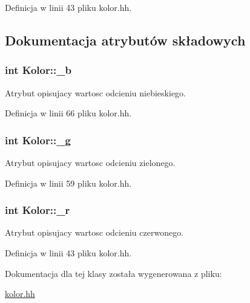 Definicja w linii 43 pliku kolor.\+hh.



\subsection{Dokumentacja atrybutów składowych}
\hypertarget{class_kolor_a543b5984743ac9d471409c697382038b}{}
\subsubsection[{\+\_\+b}]{\setlength{\rightskip}{0pt plus 5cm}int Kolor\+::\+\_\+b}\label{class_kolor_a543b5984743ac9d471409c697382038b}
Atrybut opisujacy wartosc odcieniu niebieskiego. 

Definicja w linii 66 pliku kolor.\+hh.

\hypertarget{class_kolor_a568f73268d43f0e76c8ae75f0ef20229}{}
\subsubsection[{\+\_\+g}]{\setlength{\rightskip}{0pt plus 5cm}int Kolor\+::\+\_\+g}\label{class_kolor_a568f73268d43f0e76c8ae75f0ef20229}
Atrybut opisujacy wartosc odcieniu zielonego. 

Definicja w linii 59 pliku kolor.\+hh.

\hypertarget{class_kolor_ad887fb53be523b39fbead6a24671751e}{}
\subsubsection[{\+\_\+r}]{\setlength{\rightskip}{0pt plus 5cm}int Kolor\+::\+\_\+r}\label{class_kolor_ad887fb53be523b39fbead6a24671751e}
Atrybut opisujacy wartosc odcieniu czerwonego. 

Definicja w linii 43 pliku kolor.\+hh.



Dokumentacja dla tej klasy została wygenerowana z pliku\+:\begin{DoxyCompactItemize}
\item 
\hyperlink{kolor_8hh}{kolor.\+hh}\end{DoxyCompactItemize}
